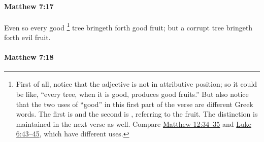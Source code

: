 		\paragraph{Matthew 7:17} %
			\label{MATTHEW-7-17}

			Even so every good%
				\footnote{%
					First of all, notice that the adjective  is not in attributive position; so it could be like, ``every tree, when it is good, produces good fruits.'' But also notice that the two uses of ``good'' in this first part of the verse are different Greek words. The first is \hyperref[AGATHOS]{} and the second is \hyperref[KALOS]{}, referring to the fruit. The distinction is maintained in the next verse as well. Compare \hyperref[MATTHEW-12-34]{Matthew 12:34--35} and \hyperref[LUKE-6-43]{Luke 6:43--45}, which have different uses.
					}
			tree bringeth forth good fruit; but a corrupt tree bringeth forth evil fruit.

			\begin{framed}
			\scriptsize
				\begin{compactdesc}
					\item[SBLG]  \hyperref[AGATHOS]{}  \hyperref[KALOS]{} 
				\end{compactdesc}
			\end{framed}

		\paragraph{Matthew 7:18} %
			\label{MATTHEW-7-18}

